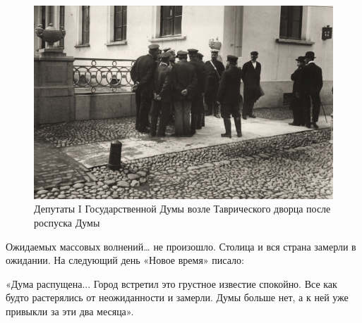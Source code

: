 \begin{figure}[h!tb] 
	\centering\includegraphics[scale=0.5]{Vozzvanie/aZhjQNDP7hY.jpg}
	\caption{Депутаты I Государственной Думы возле Таврического дворца после роспуска Думы }%
\end{figure}

Ожидаемых массовых волнений… не произошло. Столица и вся страна замерли в ожидании. На следующий день «Новое время» писало:
\begin{textcitation}
«Дума распущена... Город встретил это грустное известие спокойно. Все как будто растерялись от неожиданности и замерли. Думы больше нет, а к ней уже привыкли за эти два месяца».
\end{textcitation}

